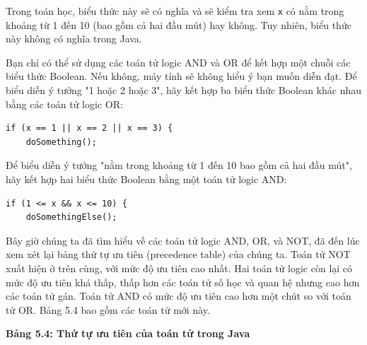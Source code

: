 Trong toán học, biểu thức này sẽ có nghĩa và sẽ kiểm tra xem \texttt{x} có nằm trong khoảng từ 1 đến 10 (bao gồm cả hai đầu mút) hay không. Tuy nhiên, biểu thức này không có nghĩa trong Java.

Bạn chỉ có thể sử dụng các toán tử logic AND và OR để kết hợp một chuỗi các biểu thức Boolean. Nếu không, máy tính sẽ không hiểu ý bạn muốn diễn đạt. Để biểu diễn ý tưởng "1 hoặc 2 hoặc 3", hãy kết hợp ba biểu thức Boolean khác nhau bằng các toán tử logic OR:
\begin{verbatim}
if (x == 1 || x == 2 || x == 3) {
    doSomething();
\end{verbatim}


Để biểu diễn ý tưởng "nằm trong khoảng từ 1 đến 10 bao gồm cả hai đầu mút", hãy kết hợp hai biểu thức Boolean bằng một toán tử logic AND:
\begin{verbatim}
if (1 <= x && x <= 10) {
    doSomethingElse();
\end{verbatim}


Bây giờ chúng ta đã tìm hiểu về các toán tử logic AND, OR, và NOT, đã đến lúc xem xét lại bảng thứ tự ưu tiên (precedence table) của chúng ta. Toán tử NOT xuất hiện ở trên cùng, với mức độ ưu tiên cao nhất. Hai toán tử logic còn lại có mức độ ưu tiên khá thấp, thấp hơn các toán tử số học và quan hệ nhưng cao hơn các toán tử gán. Toán tử AND có mức độ ưu tiên cao hơn một chút so với toán tử OR. Bảng 5.4 bao gồm các toán tử mới này.

\noindent \textbf{Bảng 5.4: Thứ tự ưu tiên của toán tử trong Java}